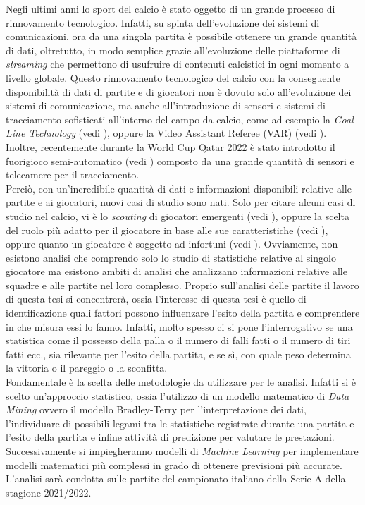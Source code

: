 Negli ultimi anni lo sport del calcio è stato oggetto di un grande processo di rinnovamento tecnologico. Infatti, su spinta dell'evoluzione dei sistemi di comunicazioni, ora da una singola partita è possibile ottenere un grande quantità di dati, oltretutto, in modo semplice grazie all'evoluzione delle piattaforme di \emph{streaming} che permettono di usufruire di contenuti calcistici in ogni momento a livello globale. Questo rinnovamento tecnologico del calcio con la conseguente disponibilità di dati di partite e di giocatori non è dovuto solo all'evoluzione dei sistemi di comunicazione, ma anche all'introduzione di sensori e sistemi di tracciamento sofisticati all'interno del campo da calcio, come ad esempio la \emph{Goal-Line Technology} (vedi \textit{\cite{glt}}), oppure la Video Assistant Referee (VAR) (vedi \textit{\cite{var}}). Inoltre, recentemente durante la World Cup Qatar 2022 è stato introdotto il fuorigioco semi-automatico (vedi \textit{\cite{offside}}) composto da una grande quantità di sensori e telecamere per il tracciamento. \\
Perciò, con un'incredibile quantità di dati e informazioni disponibili relative alle partite e ai giocatori, nuovi casi di studio sono nati. Solo per citare alcuni casi di studio nel calcio, vi è lo \textit{scouting} di giocatori emergenti (vedi \autocite{vilela2018towards}), oppure la scelta del ruolo più adatto per il giocatore in base alle sue caratteristiche (vedi \autocite{razali2017predicting}), oppure quanto un giocatore è soggetto ad infortuni (vedi \autocite{theron2020use}). Ovviamente, non esistono analisi che comprendo solo lo studio di statistiche relative al singolo giocatore ma esistono ambiti di analisi che analizzano informazioni relative alle squadre e alle partite nel loro complesso. Proprio sull'analisi delle partite il lavoro di questa tesi si concentrerà, ossia l'interesse di questa tesi è quello di identificazione quali fattori possono influenzare l'esito della partita e comprendere in che misura essi lo fanno. Infatti, molto spesso ci si pone l'interrogativo se una statistica come il possesso della palla o il numero di falli fatti o il numero di tiri fatti ecc., sia rilevante per l'esito della partita, e se sì, con quale peso determina la vittoria o il pareggio o la sconfitta.\\
Fondamentale è la scelta delle metodologie da utilizzare per le analisi. Infatti si è scelto un'approccio statistico, ossia l'utilizzo di un modello matematico di \emph{Data Mining} ovvero il modello Bradley-Terry \autocite{bradley1952rank} per l'interpretazione dei dati, l'individuare di possibili legami tra le statistiche registrate durante una partita e l'esito della partita e infine attività di predizione per valutare le prestazioni. Successivamente si impiegheranno modelli di \emph{Machine Learning} per implementare modelli matematici più complessi in grado di ottenere previsioni più accurate. L'analisi sarà condotta sulle partite del campionato italiano della Serie A della stagione 2021/2022.
